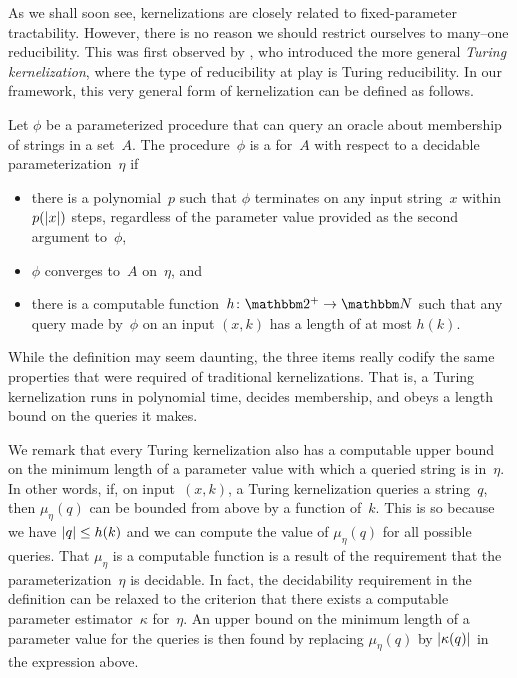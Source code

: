As we shall soon see, kernelizations are closely related to fixed-parameter tractability.
However, there is no reason we should restrict ourselves to many--one reducibility.
This was first observed by \textcite{lokshtanov2009new}, who introduced the more general \emph{Turing kernelization}, where the type of reducibility at play is Turing reducibility.
In our framework, this very general form of kernelization can be defined as follows.
\begin{definition}
\label{def:turing_kernelization}%
  Let $\phi$ be a parameterized procedure that can query an oracle about membership of strings in a set~$A$.
  The procedure~$\phi$ is a  for~$A$ with respect to a decidable parameterization~$\eta$ if
  \begin{itemize}
  \item there is a polynomial~$p$ such that $\phi$ terminates on any input string~$x$ within $p({\lvert x\rvert})$ steps, regardless of the parameter value provided as the second argument to~$\phi$,
  \item $\phi$ converges to~$A$ on~$\eta$, and
  \item there is a computable function~$h\colon \binary^+ \to \bbN$ such that any query made by~$\phi$ on an input $(x, k)$ has a length of at most $h(k)$.
  \end{itemize}
\end{definition}
While the definition may seem daunting, the three items really codify the same properties that were required of traditional kernelizations.
That is, a Turing kernelization runs in polynomial time, decides membership, and obeys a length bound on the queries it makes.

We remark that every Turing kernelization also has a computable upper bound on the minimum length of a parameter value with which a queried string is in~$\eta$.
In other words, if, on input~$(x, k)$, a Turing kernelization queries a string~$q$, then $\mu_\eta(q)$ can be bounded from above by a function of~$k$.
This is so because we have ${\lvert q\rvert} \le h(k)$ and we can compute the value of $\mu_\eta(q)$ for all possible queries.
That $\mu_\eta$ is a computable function is a result of the requirement that the parameterization~$\eta$ is decidable.
In fact, the decidability requirement in the definition can be relaxed to the criterion that there exists a computable parameter estimator~$\kappa$ for~$\eta$.
An upper bound on the minimum length of a parameter value for the queries is then found by replacing $\mu_\eta(q)$ by ${\lvert\kappa(q)\rvert}$ in the expression above.

